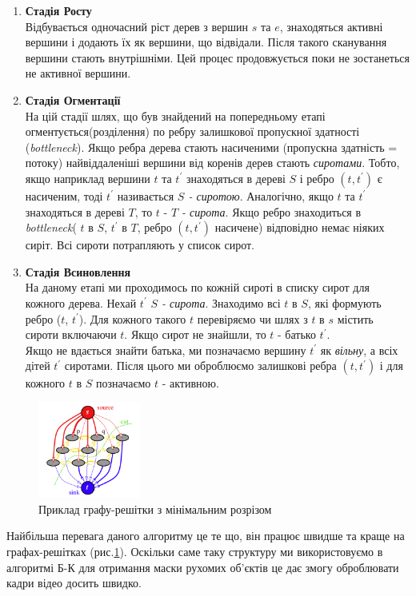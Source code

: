 \begin{enumerate}
    \item \textbf{Стадія Росту} \\
          Відбувається одночасний ріст дерев з вершин $s$ та $e$, знаходяться активні
          вершини і додають їх як вершини, що відвідали. Після такого сканування вершини
          стають внутрішніми. Цей процес продовжується поки не зостанеться не активної вершини.
    \item \textbf{Стадія Огментації} \\
          На цій стадії шлях, що був знайдений на попередньому етапі огментується(розділення)
          по ребру залишкової пропускної здатності (\textit{bottleneck}). Якщо ребра дерева стають
          насиченими (пропускна здатність = потоку) найвіддаленіші вершини від коренів дерев стають
          \textit{сиротами}. Тобто, якщо наприклад вершини $t$ та $t^{'}$ знаходяться в дереві $S$
          і ребро $(t,t^{'})$ є насиченим, тоді $t^{'}$ називається \textit{$S$ - сиротою}.
          Аналогічно, якщо $t$ та $t^{'}$ знаходяться в дереві $T$, то  $t$ - \textit{$T$ - сирота}.
          Якщо ребро знаходиться в \textit{bottleneck}( $t$ в $S$, $t^{'}$ в $T$, ребро $(t,t^{'})$
          насичене) відповідно немає ніяких сиріт. Всі сироти потрапляють у список сирот.
    \item \textbf{Стадія Всиновлення} \\
          На даному етапі ми проходимось по кожній сироті в списку сирот для кожного дерева.
          Нехай $t^{'}$ \textit{$S$ - сирота}. Знаходимо всі $t$  в $S$, які формують ребро
          ($t$, $t^{'}$). Для кожного такого $t$ перевіряємо чи шлях з $t$ в $s$ містить сироти
          включаючи $t$. Якщо сирот не знайшли, то $t$ - батько  $t^{'}$. \\
          Якщо не вдається знайти батька, ми позначаємо вершину $t^{'}$ як \textit{вільну}, а всіх
          дітей $t^{'}$ сиротами. Після цього ми оброблюємо залишкові ребра $(t,t^{'})$ і для кожного $t$ в $S$ позначаємо
          $t$ - активною.
\end{enumerate}


\begin{figure}[h]
    \centering
    \includegraphics[width=0.3\textwidth]{images/graph_cut}
    \caption{Приклад графу-решітки з мінімальним розрізом
        \label{fig:graph_lattice}
    }
\end{figure}

Найбільша перевага даного алгоритму це те що, він працює швидше та краще на графах-решітках
(рис.\ref{fig:graph_lattice}).
Оскільки саме таку структуру ми використовуємо в алгоритмі Б-К для отримання маски рухомих
об'єктів це дає змогу оброблювати кадри відео досить швидко.
